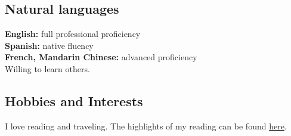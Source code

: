 \documentclass[11pt]{article}
\begin{document}
\subsection*{Natural languages}
\label{sec:org0ce5b0b}
\textbf{English:} full professional proficiency\\
\textbf{Spanish:} native fluency\\
\textbf{French, Mandarin Chinese:} advanced proficiency\\
Willing to learn others.\\
\subsection*{Hobbies and Interests}
\label{sec:orga241c32}
I love reading and traveling. The highlights of my reading can be found \href{https://github.com/RCoeurjoly/my\_clippings/blob/master/clippings.org}{here}.\\
\end{document}

